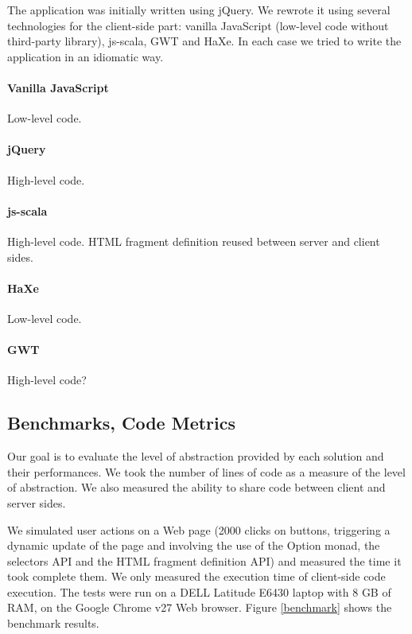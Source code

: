 \documentclass[preprint]{sigplanconf}
\begin{document}
The application was initially written using jQuery. We rewrote it using several technologies for the client-side
part: vanilla JavaScript (low-level code without third-party library), js-scala, GWT and HaXe. In each case we tried
to write the application in an idiomatic way.

\paragraph*{Vanilla JavaScript} Low-level code.

\paragraph*{jQuery} High-level code.

\paragraph*{js-scala} High-level code. HTML fragment definition reused between server and client sides.

\paragraph*{HaXe} Low-level code.

\paragraph*{GWT} High-level code?

\subsection{Benchmarks, Code Metrics}

Our goal is to evaluate the level of abstraction provided by each solution and their performances. We took the
number of lines of code as a measure of the level of abstraction. We also measured the ability to share code between
client and server sides.

We simulated user actions on a Web page (2000 clicks on buttons, triggering a dynamic update of the page and
involving the use of the Option monad, the selectors API and the HTML fragment definition API) and measured the time
it took complete them. We only measured the execution time of client-side code execution. The tests were run on a
DELL Latitude E6430 laptop with 8 GB of RAM, on the Google Chrome v27 Web browser. Figure \ref{benchmark} shows the
benchmark results.
\end{document}
